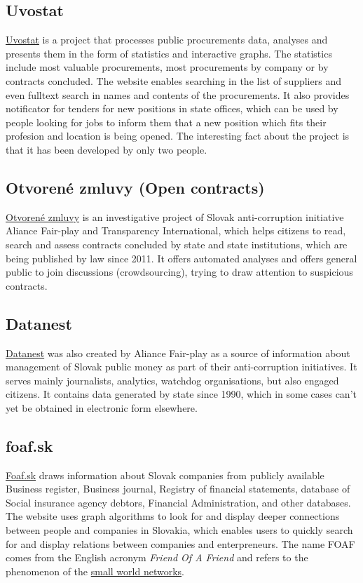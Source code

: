 \documentclass[thesis=B,english]{FITthesis}[2012/06/26]
\begin{document}
	\subsection{Uvostat}
	\label{uvostat}
	\href{https://www.uvostat.sk/about}{Uvostat} is a project that processes public procurements data, analyses and presents them in the form of statistics and interactive graphs. The statistics include most valuable procurements, most procurements by company or by contracts concluded. The website enables searching in the list of suppliers and even fulltext search in names and contents of the procurements. It also provides notificator for tenders for new positions in state offices, which can be used by people looking for jobs to inform them that a new position which fits their profesion and location is being opened. The interesting fact about the project is that it has been developed by only two people.
	\subsection{Otvorené zmluvy (Open contracts)}
	\href{http://www.otvorenezmluvy.sk/o-projekte}{Otvorené zmluvy} is an investigative project of Slovak anti-corruption initiative Aliance Fair-play and Transparency International, which helps citizens to read, search and assess contracts concluded by state and state institutions, which are being published by law since 2011. It offers automated analyses and offers general public to join discussions (crowdsourcing), trying to draw attention to suspicious contracts.	
	\subsection{Datanest}
	\href{http://datanest.fair-play.sk/}{Datanest} was also created by Aliance Fair-play as a source of information about management of Slovak public money as part of their anti-corruption initiatives. It serves mainly journalists, analytics, watchdog organisations, but also engaged citizens. It contains data generated by state since 1990, which in some cases can't yet be obtained in electronic form elsewhere.
	\subsection{foaf.sk}
	\href{http://foaf.sk}{Foaf.sk} draws information about Slovak companies from publicly available Business register, Business journal, Registry of financial statements, database of Social insurance agency debtors, Financial Administration, and other databases. The website uses graph algorithms to look for and display deeper connections between people and companies in Slovakia, which enables users to quickly search for and display relations between companies and enterpreneurs. The name FOAF comes from the English acronym \textit{Friend Of A Friend} and refers to the phenomenon of the \href{http://www.scholarpedia.org/article/Small-world_network}{small world networks}.
\end{document}
